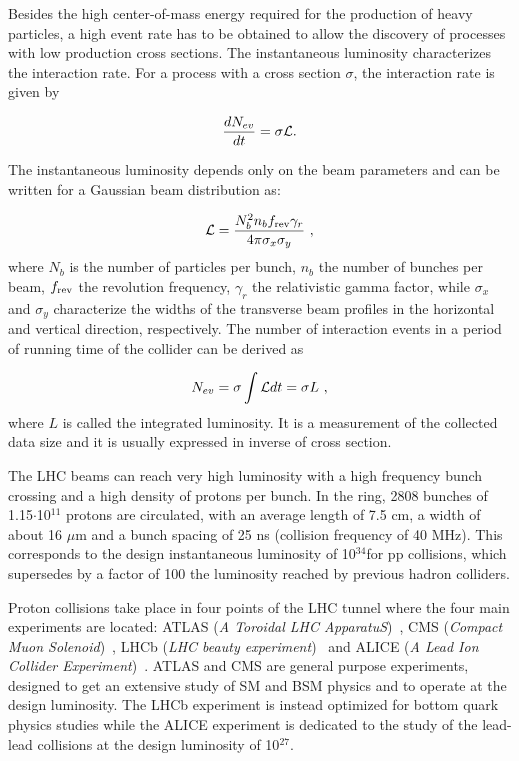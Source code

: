 Besides the high center-of-mass energy required for the production of heavy particles, a high event rate has to be obtained to allow the discovery of processes with low production cross sections. The instantaneous luminosity \Lumi characterizes the interaction rate. For a process with a cross section $\sigma$, the interaction rate is given by

\begin{equation}
\frac{dN_{ev}}{dt} = \sigma\mathcal{L}.
\end{equation}

The instantaneous luminosity depends only on the beam parameters and can be written for a Gaussian beam distribution as:

\begin{equation}
\mathcal{L} = \frac{N_b^2n_bf_{\rm rev}\gamma_r}{4\pi\sigma_x\sigma_y}~\mathrm{,}
\end{equation}
where $N_b$ is the number of particles per bunch, $n_b$ the number of bunches per beam, $f_{\rm rev}$ the revolution frequency, $\gamma_r$ the relativistic gamma factor, while $\sigma_x$ and $\sigma_y$ characterize the widths of the transverse beam profiles in the horizontal and vertical direction, respectively. The number of interaction events in a period of running time of the collider can be derived as

\begin{equation}
N_{ev} = \sigma \int \mathcal{L} dt = \sigma L~\mathrm{,}
\end{equation}
where $L$ is called the integrated luminosity. It is a measurement of the collected data size and it is usually expressed in inverse of cross section.

The LHC beams can reach very high luminosity with a high frequency bunch crossing and a high density of protons per bunch. In the ring, 2808 bunches of 1.15$\cdot$10$^{11}$ protons are circulated, with an average length of 7.5 cm, a width of about 16 $\mu$m and a bunch spacing of 25 ns (collision frequency of 40 MHz). This corresponds to the design instantaneous luminosity of 10$^{34}$\percms for pp collisions, which supersedes by a factor of 100 the luminosity reached by previous hadron colliders.

Proton collisions take place in four points of the LHC tunnel where the four main experiments are located: ATLAS ({\itshape A Toroidal LHC ApparatuS})~\cite{Aad:2008zzm}, CMS ({\itshape Compact Muon Solenoid})~\cite{Chatrchyan:2008zzk}, LHCb ({\itshape LHC beauty experiment})~\cite{Alves:2008zz} and ALICE ({\itshape A Lead Ion Collider Experiment})~\cite{Aamodt:2008zz}. ATLAS and CMS are general purpose experiments, designed to get an extensive study of SM and BSM physics and to operate at the design luminosity. The LHCb experiment is instead optimized for bottom quark physics studies while the ALICE experiment is dedicated to the study of the lead-lead collisions at the design luminosity of 10$^{27}$\percms.\\

